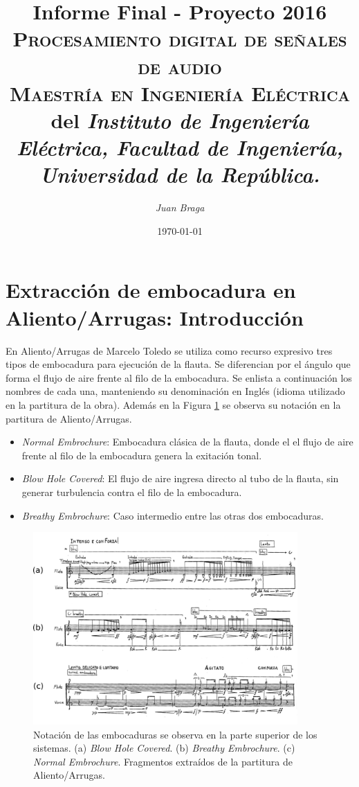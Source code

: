 \documentclass{article}
\title{\textbf{Informe Final - Proyecto 2016}\\\large \textsc{Procesamiento digital de señales de audio}\\
 \textsc{Maestría en Ingeniería Eléctrica} del \textit{Instituto de Ingeniería Eléctrica, Facultad de Ingeniería, Universidad de la República.}}
\author{\textit{Juan Braga}}
\date{\today}
\begin{document}
\maketitle 


\section*{Extracción de embocadura en Aliento/Arrugas: Introducción}
En Aliento/Arrugas de Marcelo Toledo se utiliza como recurso expresivo tres tipos de embocadura para ejecución de la flauta. Se diferencian por el ángulo que forma el flujo de aire frente al filo de la embocadura. Se enlista a continuación los nombres de cada una, manteniendo su denominación en Inglés (idioma utilizado en la partitura de la obra). Además en la Figura \ref{fig:embocaduras} se observa su notación en la partitura de Aliento/Arrugas.

\begin{itemize}
  \item \textit{Normal Embrochure}: Embocadura clásica de la flauta, donde el el flujo de aire frente al filo de la embocadura genera la exitación tonal. 
  \item \textit{Blow Hole Covered}: El flujo de aire ingresa directo al tubo de la flauta, sin generar turbulencia contra el filo de la embocadura. 
  \item \textit{Breathy Embrochure}: Caso intermedio entre las otras dos embocaduras. 
\end{itemize}
\medskip

\begin{figure}[H]
\begin{center}
\includegraphics[width=0.9\textwidth]{embocaduras} 
\caption{Notación de las embocaduras se observa en la parte superior de los sistemas. (a) \textit{Blow Hole Covered}. (b) \textit{Breathy Embrochure}. (c) \textit{Normal Embrochure}. Fragmentos extraídos de la partitura de Aliento/Arrugas.}
\label{fig:embocaduras}
\end{center}
\end{figure}
\end{document}

